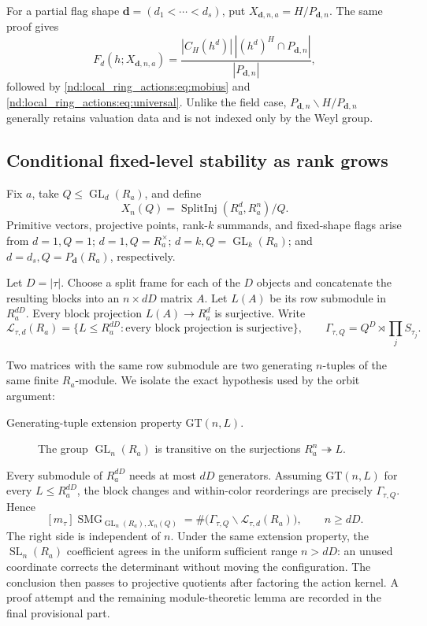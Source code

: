 \documentclass[10pt]{article}
\newcommand{\SMG}{\operatorname{SMG}}
\newcommand{\MGF}{\SMG}
\newcommand{\GL}{\operatorname{GL}}
\newcommand{\SL}{\operatorname{SL}}
\begin{document}
For a partial flag shape $\mathbf d=(d_1<\cdots<d_s)$, put
$X_{\mathbf d,n,a}=H/P_{\mathbf d,n}$.  The same proof gives
\begin{equation}\label{nd:local_ring_actions:eq:flag}
 F_d(h;X_{\mathbf d,n,a})
 =\frac{|C_H(h^d)|\,|(h^d)^H\cap P_{\mathbf d,n}|}{|P_{\mathbf d,n}|},
\end{equation}
followed by \eqref{nd:local_ring_actions:eq:mobius} and \eqref{nd:local_ring_actions:eq:universal}.  Unlike the field
case, $P_{\mathbf d,n}\backslash H/P_{\mathbf d,n}$ generally retains
valuation data and is not indexed only by the Weyl group.

\subsection{Conditional fixed-level stability as rank grows}

Fix $a$, take $Q\le\GL_d(R_a)$, and define
\[
 X_n(Q)=\operatorname{SplitInj}(R_a^d,R_a^n)/Q.
\]
Primitive vectors, projective points, rank-$k$ summands, and fixed-shape flags
arise from $d=1,Q=1$; $d=1,Q=R_a^\times$; $d=k,Q=\GL_k(R_a)$; and
$d=d_s,Q=P_{\mathbf d}(R_a)$, respectively.

Let $D=|\tau|$.  Choose a split frame for each of the $D$ objects and
concatenate the resulting blocks into an $n\times dD$ matrix $A$.  Let $L(A)$
be its row submodule in $R_a^{dD}$.  Every block projection $L(A)\to R_a^d$
is surjective.  Write
\[
 \mathcal L_{\tau,d}(R_a)=\{L\le R_a^{dD}:\text{every block projection is
 surjective}\},\qquad
 \Gamma_{\tau,Q}=Q^D\rtimes\prod_jS_{\tau_j}.
\]

Two matrices with the same row submodule are two generating $n$-tuples of
the same finite $R_a$-module. We isolate the exact hypothesis used by the
orbit argument:
\begin{description}
\item[Generating-tuple extension property $\mathrm{GT}(n,L)$.]
The group $\GL_n(R_a)$ is transitive on the surjections
$R_a^n\twoheadrightarrow L$.
\end{description}
Every submodule of $R_a^{dD}$ needs at most $dD$ generators. Assuming
$\mathrm{GT}(n,L)$ for every $L\le R_a^{dD}$, the block changes and
within-color reorderings are precisely $\Gamma_{\tau,Q}$. Hence
\begin{equation}\label{nd:local_ring_actions:eq:stable}
 \boxed{[m_\tau]\MGF_{\GL_n(R_a),X_n(Q)}
 =\#\bigl(\Gamma_{\tau,Q}\backslash\mathcal L_{\tau,d}(R_a)\bigr),
 \qquad n\ge dD.}
\end{equation}
The right side is independent of $n$. Under the same extension property, the
$\SL_n(R_a)$ coefficient agrees in the uniform sufficient range $n>dD$: an
unused coordinate corrects the determinant without moving the configuration.
The conclusion then passes to projective quotients after factoring the action
kernel. A proof attempt and the remaining module-theoretic lemma are recorded
in the final provisional part.
\end{document}

